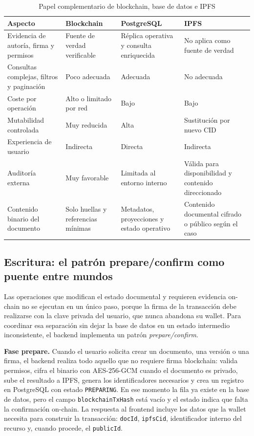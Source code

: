 \documentclass[11pt, a4paper]{article}
\begin{document}
\begin{table}[H]
    \centering
    \small
    \begin{tabular}{|p{3.8cm}|p{3.6cm}|p{3.6cm}|p{3.6cm}|}
    \hline
    \textbf{Aspecto} & \textbf{Blockchain} & \textbf{PostgreSQL} & \textbf{IPFS} \\
    \hline
    Evidencia de autoría, firma y permisos & Fuente de verdad verificable & Réplica operativa y consulta enriquecida & No aplica como fuente de verdad \\
    \hline
    Consultas complejas, filtros y paginación & Poco adecuada & Adecuada & No adecuada \\
    \hline
    Coste por operación & Alto o limitado por red & Bajo & Bajo \\
    \hline
    Mutabilidad controlada & Muy reducida & Alta & Sustitución por nuevo CID \\
    \hline
    Experiencia de usuario & Indirecta & Directa & Indirecta \\
    \hline
    Auditoría externa & Muy favorable & Limitada al entorno interno & Válida para disponibilidad y contenido direccionado \\
    \hline
    Contenido binario del documento & Solo huellas y referencias mínimas & Metadatos, proyecciones y estado operativo & Contenido documental cifrado o público según el caso \\
    \hline
    \end{tabular}
    \caption{Papel complementario de blockchain, base de datos e IPFS}
    \label{tab:blockchain-bd}
\end{table}

\subsection{Escritura: el patrón prepare/confirm como puente entre mundos}

Las operaciones que modifican el estado documental y requieren evidencia on-chain no se ejecutan en un único paso, porque la firma de la transacción debe realizarse con la clave privada del usuario, que nunca abandona su wallet. Para coordinar esa separación sin dejar la base de datos en un estado intermedio inconsistente, el backend implementa un patrón \textit{prepare/confirm}.

\textbf{Fase prepare.} Cuando el usuario solicita crear un documento, una versión o una firma, el backend realiza todo aquello que no requiere firma blockchain: valida permisos, cifra el binario con AES-256-GCM cuando el documento es privado, sube el resultado a IPFS, genera los identificadores necesarios y crea un registro en PostgreSQL con estado \texttt{PREPARING}. En ese momento la fila ya existe en la base de datos, pero el campo \texttt{blockchainTxHash} está vacío y el estado indica que falta la confirmación on-chain. La respuesta al frontend incluye los datos que la wallet necesita para construir la transacción: \texttt{docId}, \texttt{ipfsCid}, identificador interno del recurso y, cuando procede, el \texttt{publicId}.
\end{document}
